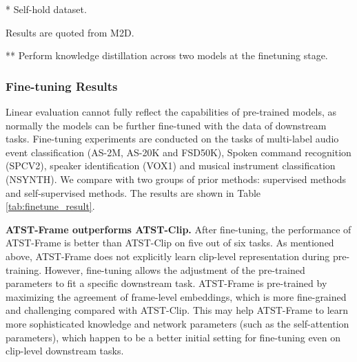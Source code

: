 \begin{table*}[ht]
{\begin{threeparttable}
\begin{tabular}{lcccccccc}
        \bottomrule
      \end{tabular}
      \begin{tablenotes}
\item{*} Self-hold dataset\cite{srivastava_conformer-based_2022}.
      \item{} Results are quoted from M2D\cite{niizumi_masked_2023}.
      \item{**} Perform knowledge distillation across two models at the finetuning stage.
      \end{tablenotes}


    \end{threeparttable}
  }
  \caption{ Finetuning results on clip-level downstream tasks. The scores of comparison models are quoted from their papers. AS and LS denote AudioSet and Librispeech\cite{panayotov2015librispeech}, respectively.  }
  \label{tab:finetune_result}
\end{table*}

\subsubsection{Fine-tuning Results}

Linear evaluation cannot fully reflect the capabilities of pre-trained models, as normally the models can be further fine-tuned with the data  of downstream tasks. Fine-tuning experiments are conducted on the tasks of multi-label audio event classification (AS-2M, AS-20K and FSD50K), Spoken command recognition (SPCV2), speaker identification (VOX1) and musical instrument classification (NSYNTH). We compare with two groups of prior methods: supervised methods and self-supervised methods. The results are shown in Table \ref{tab:finetune_result}. 

\textbf{ATST-Frame outperforms ATST-Clip.} After fine-tuning, the performance of ATST-Frame is better than ATST-Clip on five out of six tasks. As mentioned above, ATST-Frame does not explicitly learn clip-level representation during pre-training. However, fine-tuning allows the adjustment of the pre-trained parameters to fit a specific downstream task. 
ATST-Frame is pre-trained by maximizing the agreement of frame-level embeddings, which is more fine-grained and challenging compared with ATST-Clip. This may help ATST-Frame to learn more sophisticated knowledge and network parameters (such as the self-attention parameters), which happen to be a better initial setting for fine-tuning even on clip-level downstream tasks.

